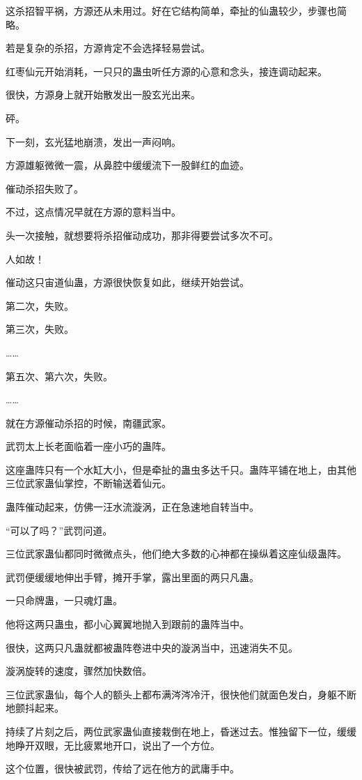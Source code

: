 \begin{this_body}
这杀招智平祸，方源还从未用过。好在它结构简单，牵扯的仙蛊较少，步骤也简略。

若是复杂的杀招，方源肯定不会选择轻易尝试。

红枣仙元开始消耗，一只只的蛊虫听任方源的心意和念头，接连调动起来。

很快，方源身上就开始散发出一股玄光出来。

砰。

下一刻，玄光猛地崩溃，发出一声闷响。

方源雄躯微微一震，从鼻腔中缓缓流下一股鲜红的血迹。

催动杀招失败了。

不过，这点情况早就在方源的意料当中。

头一次接触，就想要将杀招催动成功，那非得要尝试多次不可。

人如故！

催动这只宙道仙蛊，方源很快恢复如此，继续开始尝试。

第二次，失败。

第三次，失败。

……

第五次、第六次，失败。

……

就在方源催动杀招的时候，南疆武家。

武罚太上长老面临着一座小巧的蛊阵。

这座蛊阵只有一个水缸大小，但是牵扯的蛊虫多达千只。蛊阵平铺在地上，由其他三位武家蛊仙掌控，不断输送着仙元。

蛊阵催动起来，仿佛一汪水流漩涡，正在急速地自转当中。

“可以了吗？”武罚问道。

三位武家蛊仙都同时微微点头，他们绝大多数的心神都在操纵着这座仙级蛊阵。

武罚便缓缓地伸出手臂，摊开手掌，露出里面的两只凡蛊。

一只命牌蛊，一只魂灯蛊。

他将这两只蛊虫，都小心翼翼地抛入到跟前的蛊阵当中。

很快，这两只凡蛊就都被蛊阵卷进中央的漩涡当中，迅速消失不见。

漩涡旋转的速度，骤然加快数倍。

三位武家蛊仙，每个人的额头上都布满涔涔冷汗，很快他们就面色发白，身躯不断地颤抖起来。

持续了片刻之后，两位武家蛊仙直接栽倒在地上，昏迷过去。惟独留下一位，缓缓地睁开双眼，无比疲累地开口，说出了一个方位。

这个位置，很快被武罚，传给了远在他方的武庸手中。


\end{this_body}
